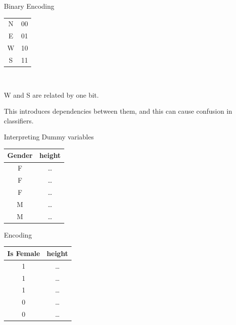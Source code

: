 \documentclass{beamer}
\begin{document}
    
    \begin{frame}{Binary Encoding}
    
    \begin{center}
    \begin{tabular}{|c|c|}
    \hline
    N & 00 \\
    E& 01\\
    W & 10\\
    S& 11\\
    \hline
    \end{tabular}\\
    \end{center}
    
    
    \vspace{1em}
    \pause W and S are related by one bit. 
    
    \pause This introduces dependencies between them, and this can cause confusion in classifiers.
    \end{frame}
    
    \begin{frame}{Interpreting Dummy variables}
    \begin{center}
    \begin{tabular}{c|c}
    Gender& height\\
    \hline
    \hline
    F & \dots \\
    F & \dots \\
    F & \dots \\
    M & \dots \\
    M & \dots \\
    \end{tabular}
    
    \end{center}
    
    \pause Encoding
    
    \begin{center}
    \pause \begin{tabular}{c|c}
    Is Female& height\\
    \hline
    \hline
    1 & \dots \\
    1 & \dots \\
    1 & \dots \\
    0 & \dots \\
    0 & \dots \\
    \end{tabular}
    \end{center}
    
    \end{frame}
    
\end{document}
